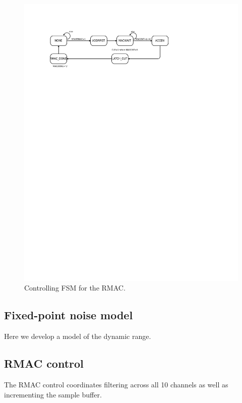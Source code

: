 \begin{figure}
\label{rmacfsm}
\includegraphics[width=6in]{RMAC_fsm.svg}
\caption{Controlling FSM for the RMAC.}
\end{figure}


\subsection{Fixed-point noise model} 
Here we develop a model of the dynamic range. 

\subsection{RMAC control}
The RMAC control coordinates filtering across all 10 channels as well as incrementing the sample buffer. 

